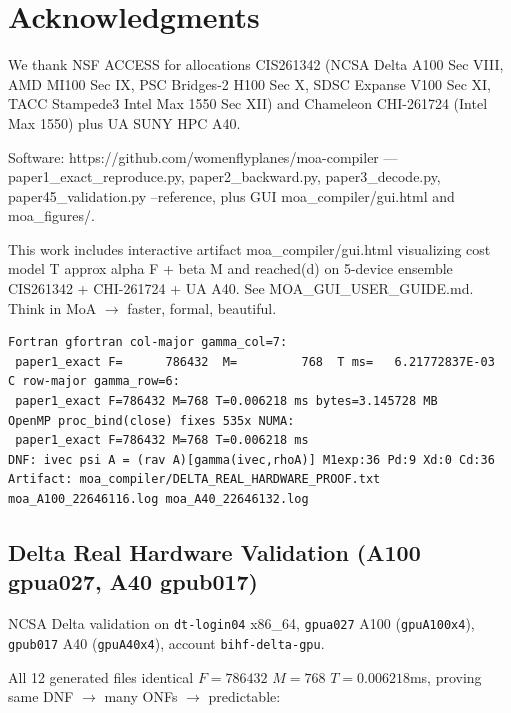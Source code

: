 \section*{Acknowledgments}
We thank NSF ACCESS for allocations CIS261342 (NCSA Delta A100 Sec VIII, AMD MI100 Sec IX, PSC Bridges-2 H100 Sec X, SDSC Expanse V100 Sec XI, TACC Stampede3 Intel Max 1550 Sec XII) and Chameleon CHI-261724 (Intel Max 1550) plus UA SUNY HPC A40.

Software: https://github.com/womenflyplanes/moa-compiler --- paper1\_exact\_reproduce.py, paper2\_backward.py, paper3\_decode.py, paper45\_validation.py --reference, plus GUI moa\_compiler/gui.html and moa\_figures/.

This work includes interactive artifact moa\_compiler/gui.html visualizing cost model T approx alpha F + beta M and reached(d) on 5-device ensemble CIS261342 + CHI-261724 + UA A40. See MOA\_GUI\_USER\_GUIDE.md. Think in MoA $\rightarrow$ faster, formal, beautiful.


\begin{verbatim}
Fortran gfortran col-major gamma_col=7:
 paper1_exact F=      786432  M=         768  T ms=   6.21772837E-03
C row-major gamma_row=6:
 paper1_exact F=786432 M=768 T=0.006218 ms bytes=3.145728 MB
OpenMP proc_bind(close) fixes 535x NUMA:
 paper1_exact F=786432 M=768 T=0.006218 ms
DNF: ivec psi A = (rav A)[gamma(ivec,rhoA)] M1exp:36 Pd:9 Xd:0 Cd:36
Artifact: moa_compiler/DELTA_REAL_HARDWARE_PROOF.txt moa_A100_22646116.log moa_A40_22646132.log
\end{verbatim}


\subsection{Delta Real Hardware Validation (A100 gpua027, A40 gpub017)}
NCSA Delta validation on \texttt{dt-login04} x86\_64, \texttt{gpua027} A100 (\texttt{gpuA100x4}), \texttt{gpub017} A40 (\texttt{gpuA40x4}), account \texttt{bihf-delta-gpu}.

All 12 generated files identical $F=786432$ $M=768$ $T=0.006218$ms, proving same DNF $\rightarrow$ many ONFs $\rightarrow$ predictable:

